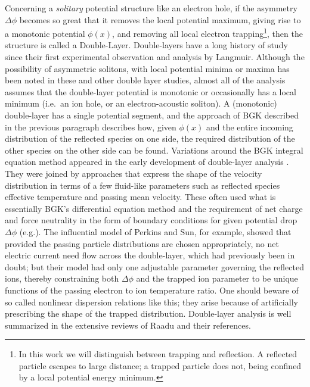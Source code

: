 \documentclass[12pt]{article}
\begin{document}
Concerning a \emph{solitary} potential structure like an electron
hole, if the asymmetry $\Delta \phi$ becomes so great that it removes
the local potential maximum, giving rise to a monotonic potential
$\phi(x)$, and removing all local electron trapping\footnote{In this
  work we will distinguish between trapping and reflection. A
  reflected particle escapes to large distance; a trapped particle
  does not, being confined by a local potential energy minimum.}, then
the structure is called a Double-Layer.  Double-layers have a long
history of study since their first experimental observation and
analysis by Langmuir\cite{Langmuir1929}. Although the possibility of
asymmetric solitons, with local potential minima or maxima has been
noted in these and other double layer studies\cite{Schamel1986},
almost all of the analysis assumes that the double-layer potential is
monotonic or occasionally has a local minimum (i.e.\ an ion hole, or
an electron-acoustic soliton\cite{Vasko2017a}).  A (monotonic)
double-layer has a single potential segment, and the approach of BGK
described in the previous paragraph describes how, given $\phi(x)$ and
the entire incoming distribution of the reflected species on one side,
the required distribution of the other species on the other side can
be found. Variations around the BGK integral equation method appeared
in the early development of double-layer analysis
\cite{Montgomery1969,Knorr1974}. They were joined by approaches that
express the shape of the velocity distribution in terms of a few
fluid-like parameters such as reflected species effective temperature
and passing mean velocity. These often used what is essentially BGK's
differential equation method and the requirement of net charge and
force neutrality in the form of boundary conditions for given
potential drop $\Delta \phi$ (e.g.\cite{Schamel1983}). The influential
model of Perkins and Sun\cite{Perkins1981}, for example, showed that
provided the passing particle distributions are chosen appropriately,
no net electric current need flow across the double-layer, which had
previously been in doubt; but their model had only one adjustable
parameter governing the reflected ions, thereby constraining both
$\Delta \phi$ and the trapped ion parameter to be unique functions of
the passing electron to ion temperature ratio. One should beware of so
called nonlinear dispersion relations like this; they arise because of
artificially prescribing the shape of the trapped distribution.
Double-layer analysis is well summarized in the extensive reviews of
Raadu\cite{Raadu1989,Raadu1988} and their references.
\end{document}
